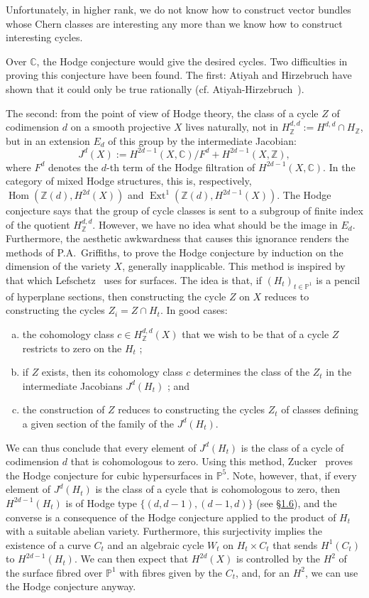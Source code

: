 \documentclass{article}
\theoremstyle{plain}
\theoremstyle{definition}
\newcommand{\ZZ}{\mathbb{Z}}
\newcommand{\CC}{\mathbb{C}}
\newcommand{\PP}{\mathbb{P}}
\DeclareMathOperator{\Hom}{Hom}
\DeclareMathOperator{\Ext}{Ext}
\newcommand{\oldpage}[1]{\marginpar{\footnotesize$\Big\vert$ \textit{p.~#1}}}
\begin{document}
\oldpage{144}
Unfortunately, in higher rank, we do not know how to construct vector bundles whose Chern classes are interesting any more than we know how to construct interesting cycles.

Over $\CC$, the Hodge conjecture would give the desired cycles.
Two difficulties in proving this conjecture have been found.
The first: Atiyah and Hirzebruch have shown that it could only be true rationally (cf. Atiyah-Hirzebruch~\cite{1}).

The second: from the point of view of Hodge theory, the class of a cycle $Z$ of codimension $d$ on a smooth projective $X$ lives naturally, not in $H_\ZZ^{d,d}:=H^{d,d}\cap H_\ZZ$, but in an extension $E_d$ of this group by the intermediate Jacobian:
\[
  J^d(X) := H^{2d-1}(X,\CC)/F^d + H^{2d-1}(X,\ZZ),
\]
where $F^d$ denotes the $d$-th term of the Hodge filtration of $H^{2d-1}(X,\CC)$.
In the category of mixed Hodge structures, this is, respectively, $\Hom(\ZZ(d),H^{2d}(X))$ and $\Ext^1(\ZZ(d),H^{2d-1}(X))$.
The Hodge conjecture says that the group of cycle classes is sent to a subgroup of finite index of the quotient $H_\ZZ^{d,d}$.
However, we have no idea what should be the image in $E_d$.
Furthermore, the aesthetic awkwardness that causes this ignorance renders the methods of P.A.~Griffiths, to prove the Hodge conjecture by induction on the dimension of the variety $X$, generally inapplicable.
This method is inspired by that which Lefschetz~\cite{24} uses for surfaces.
The idea is that, if $(H_t)_{t\in\PP^1}$ is a pencil of hyperplane sections, then constructing the cycle $Z$ on $X$ reduces to constructing the cycles $Z_i=Z\cap H_t$.
In good cases:
\begin{enumerate}[(a)]
  \item the cohomology class $c\in H_\ZZ^{d,d}(X)$ that we wish to be that of a cycle $Z$ restricts to zero on the $H_t$ ;
  \item if $Z$ exists, then its cohomology class $c$ determines the class of the $Z_t$ in the intermediate Jacobians $J^d(H_t)$ ; and
  \item the construction of $Z$ reduces to constructing the cycles $Z_t$ of classes defining a given section of the family of the $J^d(H_t)$.
\end{enumerate}
We can thus conclude that every element of $J^d(H_t)$ is the class of a cycle of codimension $d$ that is cohomologous to zero.
Using this method, Zucker~\cite{32} proves the Hodge conjecture for cubic hypersurfaces in $\PP^5$.
Note, however, that, if every element of $J^d(H_t)$ is the class of a cycle that is cohomologous to zero, then $H^{2d-1}(H_t)$ is of Hodge type $\{(d,d-1),(d-1,d)\}$ (see \hyperref[1.6]{\S1.6}), and the converse is a consequence of the Hodge conjecture applied to the product of $H_t$ with a suitable abelian variety.
Furthermore, this surjectivity implies the existence of a curve $C_t$ and an algebraic cycle $W_t$ on $H_t\times C_t$ that sends $H^1(C_t)$ to $H^{2d-1}(H_t)$.
We can then expect that $H^{2d}(X)$ is controlled by the $H^2$ of the surface fibred over $\PP^1$ with fibres given by the $C_t$, and, for an $H^2$, we can use the Hodge conjecture anyway.
\end{document}

